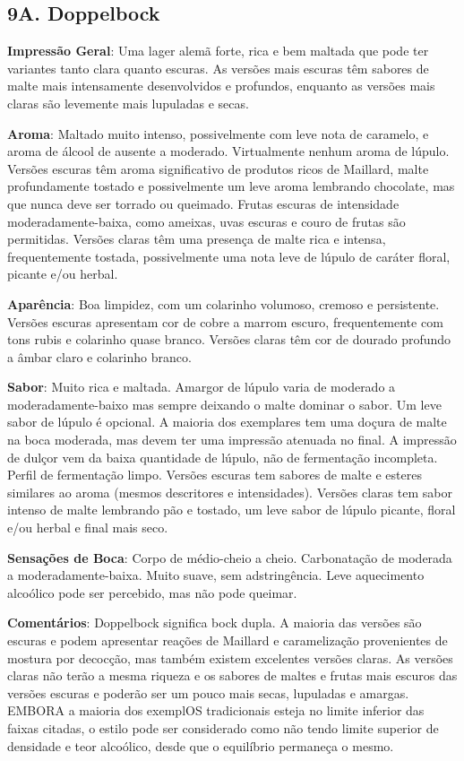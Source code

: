 \subsection*{9A. Doppelbock}
\textbf{Impressão Geral}: Uma lager alemã forte, rica e bem maltada que pode ter variantes tanto clara quanto escuras. As versões mais escuras têm sabores de malte mais intensamente desenvolvidos e profundos, enquanto as versões mais claras são levemente mais lupuladas e secas.

\textbf{Aroma}: Maltado muito intenso, possivelmente com leve nota de caramelo, e aroma de álcool de ausente a moderado. Virtualmente nenhum aroma de lúpulo. Versões escuras têm aroma significativo de produtos ricos de Maillard, malte profundamente tostado e possivelmente um leve aroma lembrando chocolate, mas que nunca deve ser torrado ou queimado. Frutas escuras de intensidade moderadamente-baixa, como ameixas, uvas escuras e couro de frutas são permitidas. Versões claras têm uma presença de malte rica e intensa, frequentemente tostada, possivelmente uma nota leve de lúpulo de caráter floral, picante e/ou herbal.

\textbf{Aparência}: Boa limpidez, com um colarinho volumoso, cremoso e persistente. Versões escuras apresentam cor de cobre a marrom escuro, frequentemente com tons rubis e colarinho quase branco. Versões claras têm cor de dourado profundo a âmbar claro e colarinho branco.

\textbf{Sabor}: Muito rica e maltada. Amargor de lúpulo varia de moderado a moderadamente-baixo mas sempre deixando o malte dominar o sabor. Um leve sabor de lúpulo é opcional. A maioria dos exemplares tem uma doçura de malte na boca moderada, mas devem ter uma impressão atenuada no final. A impressão de dulçor vem da baixa quantidade de lúpulo, não de fermentação incompleta. Perfil de fermentação limpo. Versões escuras tem sabores de malte e esteres similares ao aroma (mesmos descritores e intensidades). Versões claras tem sabor intenso de malte lembrando pão e tostado, um leve sabor de lúpulo picante, floral e/ou herbal e final mais seco.

\textbf{Sensações de Boca}: Corpo de médio-cheio a cheio. Carbonatação de moderada a moderadamente-baixa. Muito suave, sem adstringência. Leve aquecimento alcoólico pode ser percebido, mas não pode queimar.

\textbf{Comentários}: Doppelbock significa bock dupla. A maioria das versões são escuras e podem apresentar reações de Maillard e caramelização provenientes de mostura por decocção, mas também existem excelentes versões claras. As versões claras não terão a mesma riqueza e os sabores de maltes e frutas mais escuros das versões escuras e poderão ser um pouco mais secas, lupuladas e amargas. EMBORA a maioria dos exemplOS tradicionais esteja no limite inferior das faixas citadas, o estilo pode ser considerado como não tendo limite superior de densidade e teor alcoólico, desde que o equilíbrio permaneça o mesmo.

